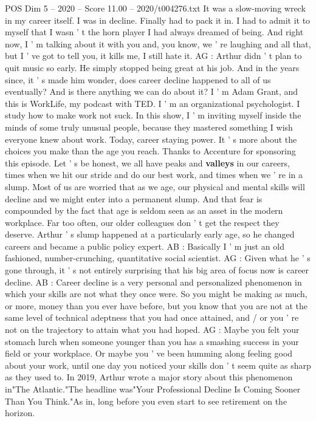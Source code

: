 \begin{textsample}{POS Dim 5 – 2020 – Score 11.00 – 2020/t004276.txt}
It was a slow-moving wreck in my career itself.
I was in decline.
Finally had to pack it in.
I had to admit it to myself that I wasn ' t the horn player I had always dreamed of being.
And right now, I ' m talking about it with you and, you know, we ' re laughing and all that, but I ' ve got to tell you, it kills me, I still hate it.
AG : Arthur didn ' t plan to quit music so early.
He simply stopped being great at his job.
And in the years since, it ' s made him wonder, does career decline happened to all of us eventually?
And is there anything we can do about it?
I ' m Adam Grant, and this is WorkLife, my podcast with TED.
I ' m an organizational psychologist.
I study how to make work not suck.
In this show, I ' m inviting myself inside the minds of some truly unusual people, because they mastered something I wish everyone knew about work.
Today, career staying power.
It ' s more about the choices you make than the age you reach.
Thanks to Accenture for sponsoring this episode.
Let ' s be honest, we all have peaks and \textbf{valleys} in our careers, times when we hit our stride and do our best work, and times when we ' re in a slump.
Most of us are worried that as we age, our physical and mental skills will decline and we might enter into a permanent slump.
And that fear is compounded by the fact that age is seldom seen as an asset in the modern workplace.
Far too often, our older colleagues don ' t get the respect they deserve.
Arthur ' s slump happened at a particularly early age, so he changed careers and became a public policy expert.
AB : Basically I ' m just an old fashioned, number-crunching, quantitative social scientist.
AG : Given what he ' s gone through, it ' s not entirely surprising that his big area of focus now is career decline.
AB : Career decline is a very personal and personalized phenomenon in which your skills are not what they once were.
So you might be making as much, or more, money than you ever have before, but you know that you are not at the same level of technical adeptness that you had once attained, and / or you ' re not on the trajectory to attain what you had hoped.
AG : Maybe you felt your stomach lurch when someone younger than you has a smashing success in your field or your workplace.
Or maybe you ' ve been humming along feeling good about your work, until one day you noticed your skills don ' t seem quite as sharp as they used to.
In 2019, Arthur wrote a major story about this phenomenon in"The Atlantic."The headline was"Your Professional Decline Is Coming Sooner Than You Think."As in, long before you even start to see retirement on the horizon.

\end{textsample}
